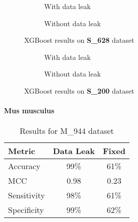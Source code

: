        \begin{figure}[H]
            \centering
            \begin{subfigure}{0.47\textwidth}
              \centering
              \resizebox{\textwidth}{!}{}
              \captionsetup{justification=centering}
              \caption{With data leak}
            \end{subfigure}%
            \hspace{0.05\textwidth}
            \begin{subfigure}{0.47\textwidth}
              \centering
              \resizebox{\textwidth}{!}{}
              \captionsetup{justification=centering}
              \caption{Without data leak}
            \end{subfigure}
            \caption{XGBoost results on \textbf{S\_628} dataset}\label{fig:xgb_s628}
        \end{figure}

        \begin{figure}[H]
            \centering
            \begin{subfigure}{0.45\textwidth}
              \centering
              \resizebox{\textwidth}{!}{}
              \captionsetup{justification=centering}
              \caption{With data leak}
            \end{subfigure}%
            \hspace{0.05\textwidth}
            \begin{subfigure}{0.45\textwidth}
              \centering
              \resizebox{\textwidth}{!}{}
              \captionsetup{justification=centering}
              \caption{Without data leak}
            \end{subfigure}
            \caption{XGBoost results on \textbf{S\_200} dataset}\label{fig:xgb_s200}
        \end{figure}

      \paragraph{Mus musculus}
        \noindent
        \begin{table}[H]
            \centering
            \begin{tabular}{lcc}
              \toprule
              \textbf{Metric} & \textbf{Data Leak} & \textbf{Fixed} \\
              \midrule
              Accuracy        & 99\%               & 61\%           \\
              MCC             & 0.98               & 0.23           \\
              Sensitivity     & 98\%               & 61\%           \\
              Specificity     & 99\%               & 62\%           \\
              \bottomrule
            \end{tabular}
            \caption{Results for M\_944 dataset}
            \label{tab:xgb_pstnpss_mm}
        \end{table}

